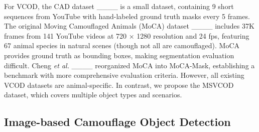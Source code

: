 For VCOD, the CAD dataset ____ is a small dataset, containing 9 short sequences from YouTube with hand-labeled ground truth masks every 5 frames. The original Moving Camouflaged Animals (MoCA) dataset ____ includes 37K frames from 141 YouTube videos at 720 × 1280 resolution and 24 fps, featuring 67 animal species in natural scenes (though not all are camouflaged). MoCA provides ground truth as bounding boxes, making segmentation evaluation difficult. Cheng \emph {et al.} ____ reorganized MoCA into MoCA-Mask, establishing a benchmark with more comprehensive evaluation criteria. However, all existing VCOD datasets are animal-specific. In contrast, we propose the MSVCOD dataset, which covers multiple object types and scenarios.



\subsection{Image-based Camouflage Object Detection}




